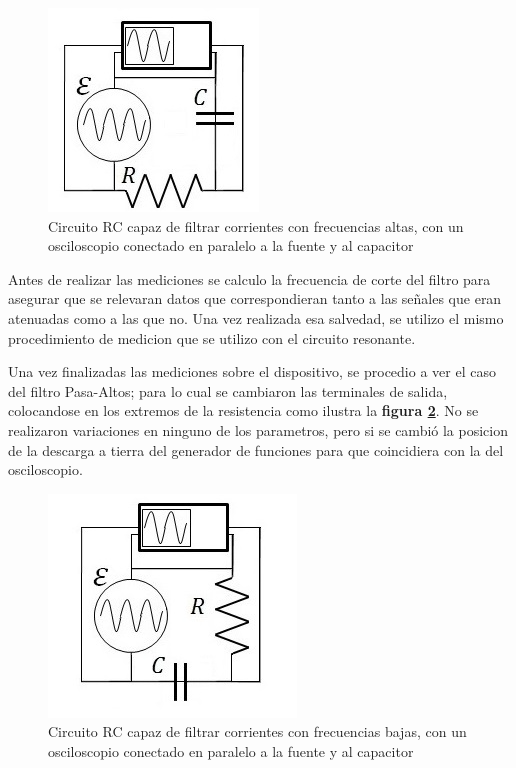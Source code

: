 \documentclass[11pt,a4paper]{article}
\begin{document}
\begin{figure}[h]
\centering
\includegraphics[scale=0.9]{Circuito-RC-Pasa-Bajos}
  \caption{Circuito RC capaz de filtrar corrientes con frecuencias altas, con un osciloscopio conectado en paralelo a la fuente y al capacitor}
  \label{fig:RC-PB}
\end{figure}

Antes de realizar las mediciones se calculo la frecuencia de corte del filtro para asegurar que se relevaran datos que correspondieran tanto a las señales que eran atenuadas como a las que no. Una vez realizada esa salvedad, se utilizo el mismo procedimiento de medicion que se utilizo con el circuito resonante. 

Una vez finalizadas las mediciones sobre el dispositivo, se procedio a ver el caso del filtro Pasa-Altos; para lo cual se cambiaron las terminales de salida, colocandose en los extremos de la resistencia como ilustra la \textbf{figura \ref{fig:RC-PA}}. No se realizaron variaciones en ninguno de los parametros, pero si se cambió la posicion de la descarga a tierra del generador de funciones para que coincidiera con la del osciloscopio.

\begin{figure}[h]
\centering
\includegraphics[scale=0.9]{Circuito-RC-Pasa-Altos}
  \caption{Circuito RC capaz de filtrar corrientes con frecuencias bajas, con un osciloscopio conectado en paralelo a la fuente y al capacitor}
  \label{fig:RC-PA}
\end{figure}
\end{document}
